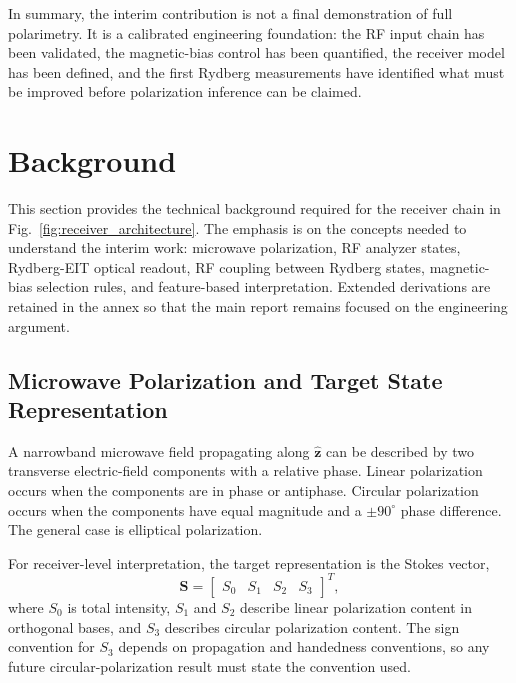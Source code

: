 \documentclass{ieeeaccess}
\begin{document}
In summary, the interim contribution is not a final demonstration of full polarimetry. It is a calibrated engineering foundation: the RF input chain has been validated, the magnetic-bias control has been quantified, the receiver model has been defined, and the first Rydberg measurements have identified what must be improved before polarization inference can be claimed.

\section{Background}
\label{sec:background}

This section provides the technical background required for the receiver chain in Fig.~\ref{fig:receiver_architecture}. The emphasis is on the concepts needed to understand the interim work: microwave polarization, RF analyzer states, Rydberg-EIT optical readout, RF coupling between Rydberg states, magnetic-bias selection rules, and feature-based interpretation. Extended derivations are retained in the annex so that the main report remains focused on the engineering argument.

\subsection{Microwave Polarization and Target State Representation}
\label{subsec:bg_microwave_polarization}

A narrowband microwave field propagating along \(\hat{\mathbf{z}}\) can be described by two transverse electric-field components with a relative phase. Linear polarization occurs when the components are in phase or antiphase. Circular polarization occurs when the components have equal magnitude and a \(\pm 90^\circ\) phase difference. The general case is elliptical polarization.

For receiver-level interpretation, the target representation is the Stokes vector,
\begin{equation}
\mathbf{S}=
\begin{bmatrix}
S_0&S_1&S_2&S_3
\end{bmatrix}^{T},
\label{eq:bg_stokes_vector_compact}
\end{equation}
where \(S_0\) is total intensity, \(S_1\) and \(S_2\) describe linear polarization content in orthogonal bases, and \(S_3\) describes circular polarization content. The sign convention for \(S_3\) depends on propagation and handedness conventions, so any future circular-polarization result must state the convention used.
\end{document}
